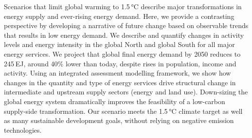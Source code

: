Scenarios that limit global warming to 1.5 °C describe major transformations in energy supply and ever-rising energy demand. Here, we provide a contrasting perspective by developing a narrative of future change based on observable trends that results in low energy demand. We describe and quantify changes in activity levels and energy intensity in the global North and global South for all major energy services. We project that global final energy demand by 2050 reduces to 245 EJ, around 40\% lower than today, despite rises in population, income and activity. Using an integrated assessment modelling framework, we show how changes in the quantity and type of energy services drive structural change in intermediate and upstream supply sectors (energy and land use). Down-sizing the global energy system dramatically improves the feasibility of a low-carbon supply-side transformation. Our scenario meets the 1.5 °C climate target as well as many sustainable development goals, without relying on negative emission technologies.
